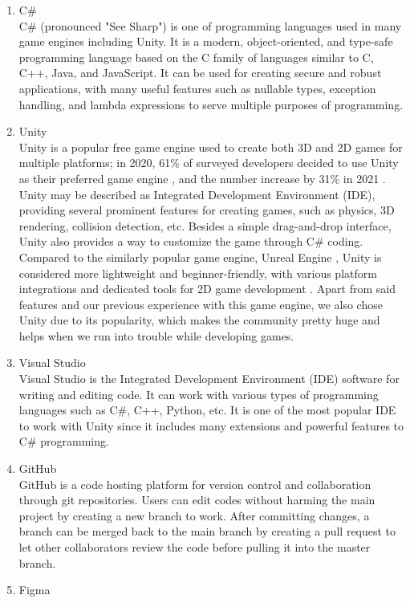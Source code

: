 \documentclass[12pt,oneside,openright,a4paper]{cpe-english-project}
\begin{document}
\begin{enumerate}
	\item C\# \\
	C\# (pronounced "See Sharp") is one of programming languages used in many game engines including Unity.  It is a modern, object-oriented, and type-safe programming language based on the C family of languages similar to C, C++, Java, and JavaScript. It can be used for creating secure and robust  applications, with many useful features such as nullable types, exception handling, and lambda expressions to serve multiple purposes of programming.
	\item Unity \\
	Unity is a popular free game engine used to create both 3D and 2D games for multiple platforms; in 2020, 61\% of surveyed developers decided to use Unity as their preferred game engine \cite{unity2021}, and the number increase by 31\% in 2021 \cite{unity2022}. Unity may be described as Integrated Development Environment (IDE), providing several prominent features for creating games, such as physics, 3D rendering, collision detection, etc. Besides a simple drag-and-drop interface, Unity also provides a way to customize the game through C\# coding. Compared to the similarly popular game engine, Unreal Engine \cite{perforce2022}, Unity is considered more lightweight and beginner-friendly, with various platform integrations and dedicated tools for 2D game development \cite{ben2022}. Apart from said features and our previous experience with this game engine, we also chose Unity due to its popularity, which makes the community pretty huge and helps when we run into trouble while developing games.
	\item Visual Studio \\
	Visual Studio is the Integrated Development Environment (IDE) software for writing and editing code. It can work with various types of programming languages such as C\#, C++, Python, etc. It is one of the most popular IDE to work with Unity since it includes many extensions and powerful features to C\# programming.
	\item GitHub \\
	GitHub is a code hosting platform for version control and collaboration through git repositories. Users can edit codes without harming the main project by creating a new branch to work. After committing changes, a branch can be merged back to the main branch by creating a pull request to let other collaborators review the code before pulling it into the master branch.
	\item Figma \\

\end{enumerate}
\end{document}
